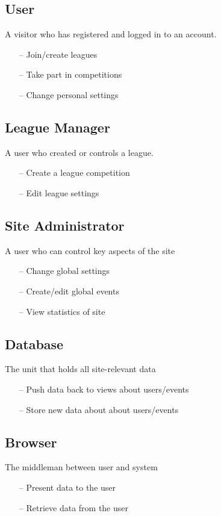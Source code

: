 \subsection{User}
A visitor who has registered and logged in to an account.
\begin{itemize}
\item[--] Join/create leagues
\item[--] Take part in competitions
\item[--] Change personal settings
\end{itemize}
\subsection{League Manager}
A user who created or controls a league.
\begin{itemize}
\item[--] Create a league competition
\item[--] Edit league settings
\end{itemize}
\subsection{Site Administrator}
A user who can control key aspects of the site
\begin{itemize}
\item[--] Change global settings
\item[--] Create/edit global events
\item[--] View statistics of site
\end{itemize}
\subsection{Database}
The unit that holds all site-relevant data
\begin{itemize}
\item[--] Push data back to views about users/events
\item[--] Store new data about about users/events
\end{itemize}
\subsection{Browser}
The middleman between user and system
\begin{itemize}
\item[--] Present data to the user
\item[--] Retrieve data from the user
\end{itemize}
